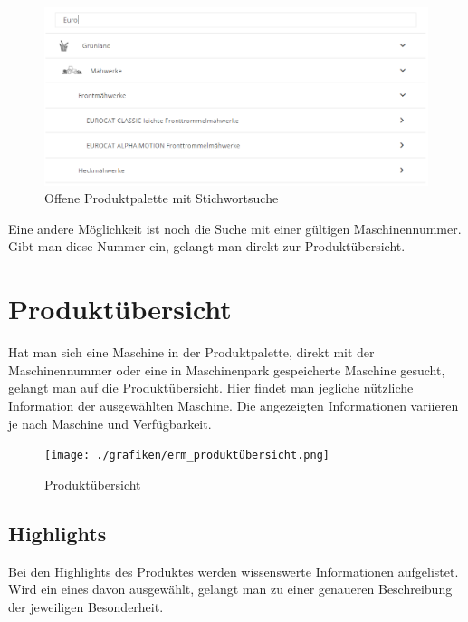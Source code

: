 \begin{figure}[H]
	\centerline{
		\includegraphics[width=1\textwidth]{./grafiken/erm_produktpalette_offen_stichwort.PNG}
	}
	\vskip0pt
	\caption{Offene Produktpalette mit Stichwortsuche} \label{fig:produktpaletteMitStichwort}
\end{figure}

Eine andere Möglichkeit ist noch die Suche mit einer gültigen Maschinennummer. Gibt man diese Nummer ein, gelangt man direkt zur Produktübersicht.

\section{Produktübersicht}

Hat man sich eine Maschine in der Produktpalette, direkt mit der Maschinennummer oder eine in Maschinenpark gespeicherte Maschine gesucht, gelangt man auf die Produktübersicht. Hier findet man jegliche nützliche Information der ausgewählten Maschine. Die angezeigten Informationen variieren je nach Maschine und Verfügbarkeit.

\begin{figure}[H]
	\centerline{
		\texttt{[image: ./grafiken/erm\_produktübersicht.png]}
	}
	\vskip0pt
	\caption{Produktübersicht} \label{fig:produktübersicht}
\end{figure}

\subsection{Highlights}

Bei den Highlights des Produktes werden wissenswerte Informationen aufgelistet. Wird ein eines davon ausgewählt, gelangt man zu einer genaueren Beschreibung der jeweiligen Besonderheit.

